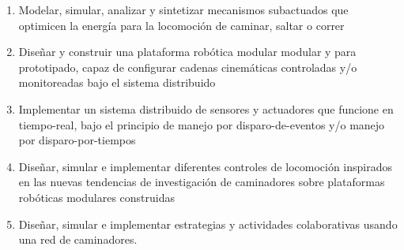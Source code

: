 {\begin{frame}
{\begin{center}
      \end{center}
    }
    \begin{enumerate}[<+-|alert@+>][\textbf{OE:} 1.]\scriptsize
    \item Modelar, simular, analizar y sintetizar mecanismos subactuados que optimicen la energ\'ia para la locomoci\'on de caminar, saltar o correr
    \item Dise\~nar y construir una plataforma rob\'otica modular modular y para prototipado, capaz de configurar cadenas cinem\'aticas  controladas y/o monitoreadas bajo el sistema distribuido
    \item Implementar un sistema distribuido de sensores y actuadores que funcione en tiempo-real, bajo el principio de manejo por disparo-de-eventos y/o manejo por disparo-por-tiempos
    \item Dise\~nar, simular e implementar diferentes controles de locomoci\'on inspirados en las nuevas tendencias de investigaci\'on de caminadores sobre plataformas rob\'oticas modulares construidas
    \item Dise\~nar, simular e implementar estrategias y actividades colaborativas usando una red de caminadores.
    \end{enumerate}
  \end{frame}
}
